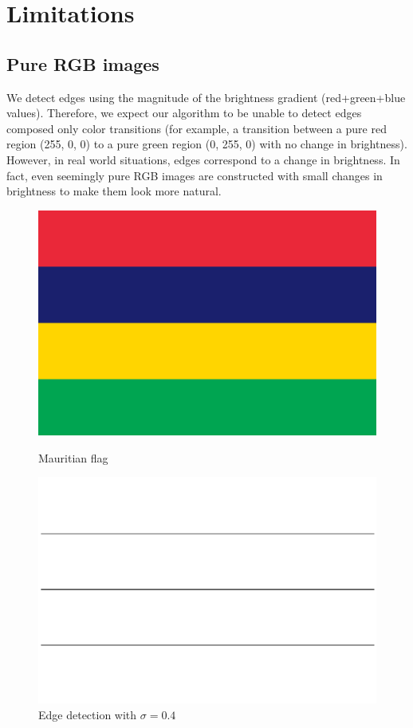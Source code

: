 \documentclass[11pt]{article}
\begin{document}
\section{Limitations}
\subsection{Pure RGB images}
We detect edges using the magnitude of the brightness gradient (red+green+blue values). Therefore, we expect our algorithm to be unable to detect edges composed only color transitions (for example, a transition between a pure red region (255, 0, 0) to a pure green region (0, 255, 0) with no change in brightness). However, in real world situations, edges correspond to a change in brightness. In fact, even seemingly pure RGB images are constructed with small changes in brightness to make them look more natural.

\begin{figure}[!htbp]
  \begin{minipage}[b]{0.5\textwidth}
    \includegraphics[width=\textwidth]{flag.png}
    \caption{Mauritian flag}
  \end{minipage}
  \hfill
  \begin{minipage}[b]{0.5\textwidth}
    \includegraphics[width=\textwidth]{sigma4_flag.png}
    \caption{Edge detection with $\sigma = 0.4$}
  \end{minipage}
\end{figure}
\end{document}

